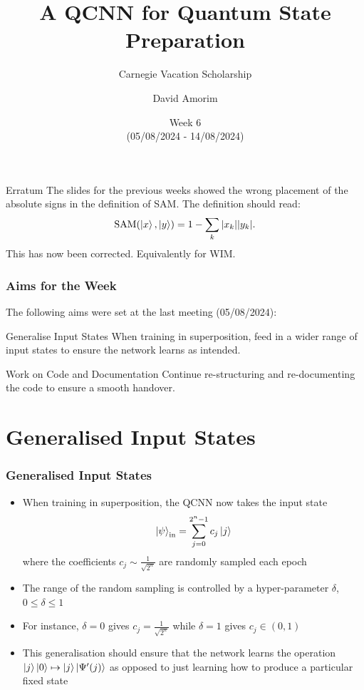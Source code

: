 \documentclass{beamer}
\title[QCNN State Preparation]{A QCNN for Quantum State Preparation}
\subtitle{Carnegie Vacation Scholarship}
\author[David Amorim]{David Amorim}
\institute[]{}
\date[14/08/2024]{Week 6 \\(05/08/2024 - 14/08/2024)}
\begin{document}
\frame{\titlepage}

\begin{frame}
\begin{exampleblock}{Erratum}
The slides for the previous weeks showed the wrong placement of the absolute signs in the definition of SAM. The definition should read:
\begin{equation}
\text{SAM}(\ket{x}, \ket{y}) = 1 - \sum_k |x_k| | y_k |.  
\end{equation}
This has now been corrected. Equivalently for WIM. 
\end{exampleblock}
\end{frame}

\begin{frame}
\frametitle{Aims for the Week}
The following aims were set at the last meeting (05/08/2024):

\begin{alertblock}{Generalise Input States}
When training in superposition, feed in a wider range of input states to ensure the network learns as intended. 
\end{alertblock}

\begin{alertblock}{Work on Code and Documentation}
Continue re-structuring and re-documenting the code to ensure a smooth handover. 
\end{alertblock}


\end{frame}

\section{Generalised Input States}

\begin{frame}
\frametitle{Generalised Input States}

\begin{itemize}
\item When training in superposition, the QCNN now takes the input state 
\begin{equation}
\ket{\psi}_\text{{in}} =\sum^{2^n-1}_{j=0} c_j \ket{j} 
\end{equation}
where the \alert{coefficients} $c_j \sim \frac{1}{\sqrt{2^n}}$ are \alert{randomly sampled} each epoch
\item The \alert{range} of the random sampling is controlled by a \alert{hyper-parameter $\delta$},  $0 \leq \delta \leq 1$ 
\item For instance,  $\delta=0$ gives $c_j = \frac{1}{\sqrt{2^n}}$ while $\delta =1$ gives $c_j \in (0,1)$
\item This generalisation should ensure that the network learns the operation $\ket{j} \ket{0} \mapsto \ket{j} \ket{\Psi'(j)}$ as opposed to just learning how to produce a particular fixed state
\end{itemize}
\end{frame}
\end{document}

